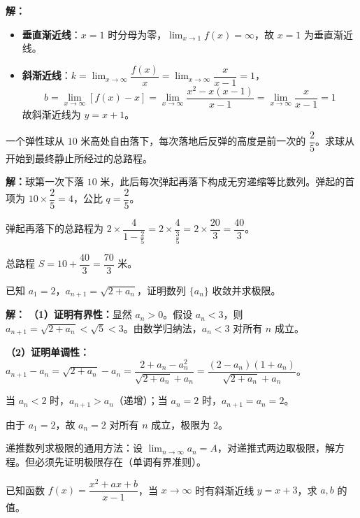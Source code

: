 \documentclass[12pt, a4paper]{ctexart}
\begin{document}
\textbf{解：}
\begin{itemize}[leftmargin=2em]
  \item \textbf{垂直渐近线}：$x = 1$ 时分母为零，$\lim_{x \to 1} f(x) = \infty$，故 $x = 1$ 为垂直渐近线。
  \item \textbf{斜渐近线}：$k = \lim_{x \to \infty} \dfrac{f(x)}{x} = \lim_{x \to \infty} \dfrac{x}{x - 1} = 1$，
  \[
  b = \lim_{x \to \infty} [f(x) - x] = \lim_{x \to \infty} \frac{x^2 - x(x-1)}{x - 1} = \lim_{x \to \infty} \frac{x}{x - 1} = 1
  \]
  故斜渐近线为 $y = x + 1$。
\end{itemize}

\begin{examplebox}[【例题4】无穷递缩等比数列求和]
一个弹性球从 $10$ 米高处自由落下，每次落地后反弹的高度是前一次的 $\dfrac{2}{5}$。求球从开始到最终静止所经过的总路程。
\end{examplebox}

\textbf{解：}球第一次下落 $10$ 米，此后每次弹起再落下构成无穷递缩等比数列。弹起的首项为 $10 \times \dfrac{2}{5} = 4$，公比 $q = \dfrac{2}{5}$。

弹起再落下的总路程为 $2 \times \dfrac{4}{1 - \frac{2}{5}} = 2 \times \dfrac{4}{\frac{3}{5}} = 2 \times \dfrac{20}{3} = \dfrac{40}{3}$。

总路程 $S = 10 + \dfrac{40}{3} = \dfrac{70}{3}$ 米。

\begin{examplebox}[【例题5】极限视角下的递推数列]
已知 $a_1 = 2$，$a_{n+1} = \sqrt{2 + a_n}$，证明数列 $\{a_n\}$ 收敛并求极限。
\end{examplebox}

\textbf{解：}
\textbf{（1）证明有界性：}显然 $a_n > 0$。假设 $a_n < 3$，则 $a_{n+1} = \sqrt{2 + a_n} < \sqrt{5} < 3$。由数学归纳法，$a_n < 3$ 对所有 $n$ 成立。

\textbf{（2）证明单调性：}$a_{n+1} - a_n = \sqrt{2 + a_n} - a_n = \dfrac{2 + a_n - a_n^2}{\sqrt{2 + a_n} + a_n} = \dfrac{(2 - a_n)(1 + a_n)}{\sqrt{2 + a_n} + a_n}$。

当 $a_n < 2$ 时，$a_{n+1} > a_n$（递增）；当 $a_n = 2$ 时，$a_{n+1} = a_n = 2$。

由于 $a_1 = 2$，故 $a_n = 2$ 对所有 $n$ 成立，极限为 $2$。

\begin{tipbox}[方法总结]
递推数列求极限的通用方法：设 $\lim_{n \to \infty} a_n = A$，对递推式两边取极限，解方程。但必须先证明极限存在（单调有界准则）。
\end{tipbox}

\begin{examplebox}[【例题6】函数极限与渐近线综合]
已知函数 $f(x) = \dfrac{x^2 + ax + b}{x - 1}$，当 $x \to \infty$ 时有斜渐近线 $y = x + 3$，求 $a, b$ 的值。
\end{examplebox}
\end{document}
